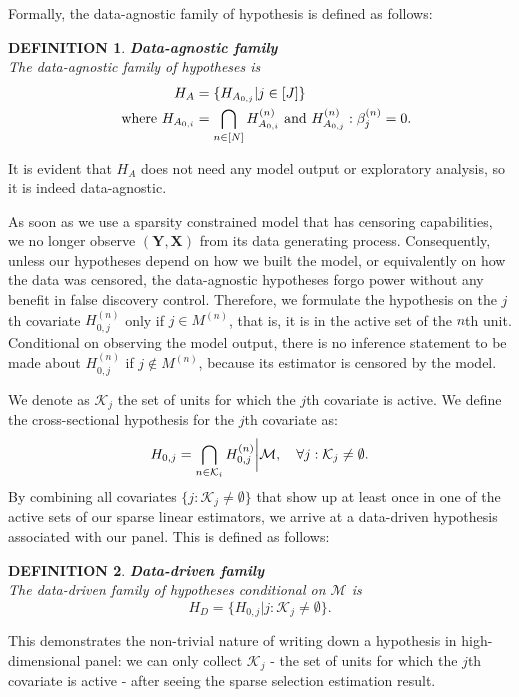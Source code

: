 \documentclass[11pt]{article}
\newcommand{\q}{\text{\quad}}
\newcommand{\wh}{\text{where }}
\newtheorem{definition}{DEFINITION}
\begin{document}
Formally, the data-agnostic family of hypothesis is defined as follows:
\begin{definition}{\bf Data-agnostic family}\\
	The data-agnostic family of hypotheses is
	\begin{equation}
		\begin{split}
			H_A&=	\{
			H_{A_{0,j}}|j\in[J]
			\}\\
			\q \wh H_{A_{0,i}}&=\bigcap_{n\in[N]}H_{A_{0,i}}^{(n)}\text{ and }H_{A_{0,j}}^{(n)}:\beta^{(n)}_j=0.
		\end{split}
	\end{equation}
\end{definition}
It is evident that $H_A$ does not need any model output or exploratory analysis, so it is indeed data-agnostic.



As soon as we use a sparsity constrained model that has censoring capabilities, we no longer observe $(\bm{Y},\bm{X})$ from its data generating process. Consequently, unless our hypotheses depend on how we built the model, or equivalently on how the data was censored, the data-agnostic hypotheses forgo power without any benefit in false discovery control. Therefore, we formulate the hypothesis on the $j$th covariate $H_{0,j}^{(n)}$ only if $j\in M^{(n)}$, that is, it is in the active set of the $n$th unit. Conditional on observing the model output, there is no inference statement to be made about $H_{0,j}^{(n)}$ if $j\notin M^{(n)}$, because its estimator is censored by the model. 

We denote as $\mathcal{K}_j$ the set of units for which the $j$th covariate is active. We define the cross-sectional hypothesis for the $j$th covariate as:
\begin{equation}
	H_{0,j}=\bigcap_{n\in\mathcal{K}_i}H_{0,j}^{(n)}\bigg\rvert \mathcal{M},\q \forall j:\mathcal{K}_j\neq\emptyset .
\end{equation}
By combining all covariates $\{j:\mathcal{K}_j\neq \emptyset\}$ that show up at least once in one of the active sets of our sparse linear estimators, we arrive at a data-driven hypothesis associated with our panel. This is defined as follows:
\begin{definition}{\bf Data-driven family}\\\label{def5}
	The data-driven family of hypotheses conditional on $\mathcal{M}$ is 
	\begin{equation}\label{23}
		H_D=	\{
		H_{0,j}|j:\mathcal{K}_j\neq\emptyset 
		\}.
	\end{equation}
\end{definition}
This demonstrates the non-trivial nature of writing down a hypothesis in high-dimensional panel: we can only collect $\mathcal{K}_j$ - the set of units for which the $j$th covariate is active - after seeing the sparse selection estimation result.
\end{document}
